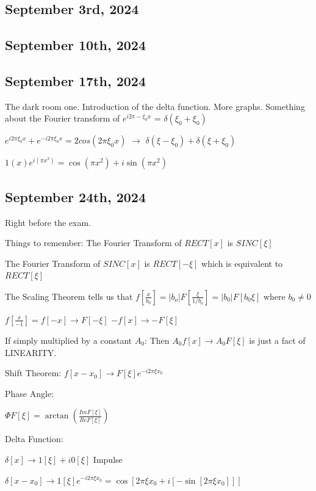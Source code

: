 \documentclass{article}
\begin{document}
\subsection{September 3rd, 2024}



\subsection{September 10th, 2024}


\subsection{September 17th, 2024}
The dark room one. 
Introduction of the delta function. 
More graphs. 
Something about the Fourier transform of $e^{i 2 \pi -\xi_{0}x}$ = $\delta(\xi_{0}+\xi_{0})$

$e^{i 2 \pi \xi_{0}x} + e^{-i 2 \pi \xi_{0}x} = 2 cos(2 \pi \xi_{0}x)$ $\longrightarrow$ $\delta(\xi-\xi_{0}) + \delta(\xi+ \xi_{0})$

$1(x)e^{i (\pi x^2)}= \cos(\pi x^2) + i \sin(\pi x^2)$

\subsection{September 24th, 2024}
Right before the exam. 



Things to remember: 
The Fourier Transform of $RECT[x]$ is $SINC[\xi]$

The Fourier Transform of $SINC[x]$ is $RECT[-\xi]$ which is equivalent to $RECT[\xi]$

The Scaling Theorem tells us that $f[\frac{x}{b_0}] = |b_o| F[\frac{\xi}{1/b_{0}}]=|b_0|F[b_{0}\xi]$ where $b_0 \neq 0$

$f[\frac{x}{-1}]= f[-x] \rightarrow F[-\xi]$
$-f[x] \rightarrow - F[\xi]$

If simply multiplied by a constant $A_0$: 
Then $A_0 f[x] \rightarrow A_0 F[\xi]$ is just a fact of LINEARITY. 

Shift Theorem: 
$f[x- x_{0}] \rightarrow F[\xi] e^{-i 2 \pi \xi x_{0}}$


Phase Angle: 

$\Phi{F[\xi]} = \arctan (\frac{Im{F[\xi]}}{Re{F[\xi]}})$

Delta Function: 

$\delta[x] \rightarrow 1[\xi] + i0[\xi]$
Impulse 

$\delta[x-x_{0}] \rightarrow 1[\xi] e^{-i2 \pi \xi x_{0}} = \cos[2 \pi \xi x_{0}+ i[-\sin[2 \pi \xi x_{0}]]]$
\end{document}
